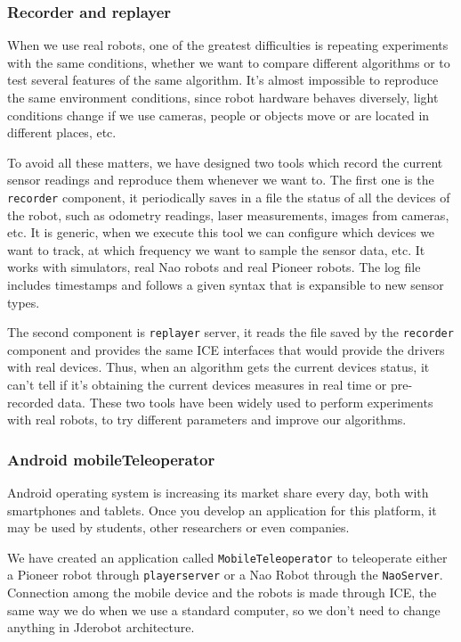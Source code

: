 \documentclass[twocolumn]{svjour3}          %
\begin{document}
\subsubsection{Recorder and replayer}

When we use real robots, one of the greatest difficulties is repeating experiments with the same conditions, whether we want to compare different algorithms or to test several features of the same algorithm. It's almost impossible to reproduce the same environment conditions, since robot hardware behaves diversely, light conditions change if we use cameras, people or objects move or are located in different places, etc.

To avoid all these matters, we have designed two tools which record the current sensor readings and reproduce them whenever we want to. The first one is the \texttt{recorder} component, it periodically saves in a file the status of all the devices of the robot, such as odometry readings, laser measurements, images from cameras, etc. It is generic, when we execute this tool we can configure which devices we want to track, at which frequency we want to sample the sensor data, etc. It works with simulators, real Nao robots and real Pioneer robots. The log file includes timestamps and follows a given syntax that is expansible to new sensor types.

The second component is \texttt{replayer} server, it reads the file saved by the \texttt{recorder} component and provides the same ICE interfaces that would provide the drivers with real devices. Thus, when an algorithm gets the current devices status, it can't tell if it's obtaining the current devices measures in real time or pre-recorded data. These two tools have been widely used to perform experiments with real robots, to try different parameters and improve our algorithms.

\subsubsection{Android mobileTeleoperator}

Android operating system is increasing its market share every day, both with smartphones and tablets. Once you develop an application for this platform, it may be used by students, other researchers or even companies. 

We have created an application called \texttt{MobileTeleoperator} to teleoperate either a Pioneer robot through \texttt{playerserver} or a Nao Robot through the \texttt{NaoServer}. Connection among the mobile device and the robots is made through ICE, the same way we do when we use a standard computer, so we don't need to change anything in Jderobot architecture.
\end{document}
